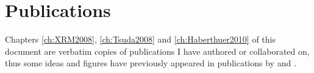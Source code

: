 \chapter*{Publications}
Chapters \ref{ch:XRM2008}, \ref{ch:Tsuda2008} and \ref{ch:Haberthuer2010} of this document are verbatim copies of publications I have authored or collaborated on, thus some ideas and figures have previously appeared in publications by \citet{Haberthuer2009,Tsuda2008} and \citet{Haberthuer2010}.